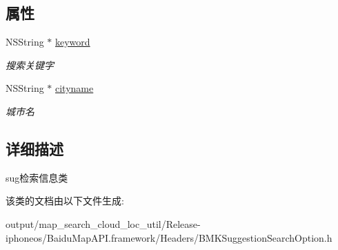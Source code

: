 \subsection*{属性}
\begin{DoxyCompactItemize}
\item 
\hypertarget{interface_b_m_k_suggestion_search_option_a2b769ad03eb52e46d9e14e8c096b6b43}{}N\+S\+String $\ast$ \hyperlink{interface_b_m_k_suggestion_search_option_a2b769ad03eb52e46d9e14e8c096b6b43}{keyword}\label{interface_b_m_k_suggestion_search_option_a2b769ad03eb52e46d9e14e8c096b6b43}

\begin{DoxyCompactList}\small\item\em 搜索关键字 \end{DoxyCompactList}\item 
\hypertarget{interface_b_m_k_suggestion_search_option_a938c2265022ca94d18c636388fc75e68}{}N\+S\+String $\ast$ \hyperlink{interface_b_m_k_suggestion_search_option_a938c2265022ca94d18c636388fc75e68}{cityname}\label{interface_b_m_k_suggestion_search_option_a938c2265022ca94d18c636388fc75e68}

\begin{DoxyCompactList}\small\item\em 城市名 \end{DoxyCompactList}\end{DoxyCompactItemize}


\subsection{详细描述}
sug检索信息类 

该类的文档由以下文件生成\+:\begin{DoxyCompactItemize}
\item 
output/map\+\_\+search\+\_\+cloud\+\_\+loc\+\_\+util/\+Release-\/iphoneos/\+Baidu\+Map\+A\+P\+I.\+framework/\+Headers/B\+M\+K\+Suggestion\+Search\+Option.\+h\end{DoxyCompactItemize}
